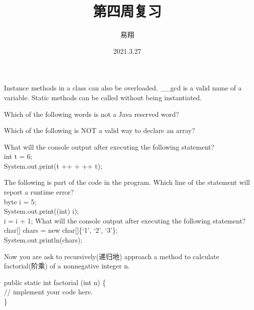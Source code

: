 \documentclass[windows]{BHCexam}
\begin{document}
\title{第四周复习}
\author{易翔}
\date{2021.3.27}

\maketitle

\begin{questions}[r]
\question Instance methods in a class can also be overloaded.
\question \_\_gcd is a valid name of a variable.
\question Static methods can be called without being instantiated.
\end{questions}

\begin{questions}[pr]
\question Which of the following words is not a Java reserved word?

\question Which of the following is NOT a valid way to declare an array?

\question What will the console output after executing the following statement?\\
int t = 6;\\
System.out.print(t ++ + ++ t);

\question The following is part of the code in the program. Which line of the statement will report a runtime error?\\
byte i = 5;\\
System.out.print((int) i);\\
i = i + 1;
\question What will the console output after executing the following statement?\\
char[] chars = new char[]\{`1', `2', `3'\};\\
System.out.println(chars);
\end{questions}

\begin{questions}[t]
\question Now you are ask to recursively(递归地) approach a method to calculate factorial(阶乘) of a nonnegative integer n.

public static int factorial (int n) \{\\
	\text{ }\quad\quad// implement your code here.\\
\}
\end{questions}
\end{document}
